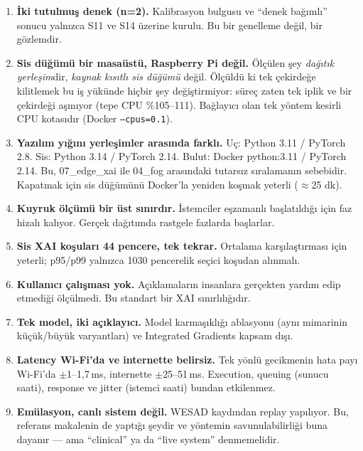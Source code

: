 \documentclass[11pt,a4paper]{report}
\newcommand{\ms}{\,ms}
\newcommand{\kod}[1]{\texttt{\small #1}}
\begin{document}
\begin{enumerate}[leftmargin=1.6em,itemsep=0.5em]

\item \textbf{İki tutulmuş denek (n=2).} Kalibrasyon bulgusu ve ``denek
bağımlı'' sonucu yalnızca S11 ve S14 üzerine kurulu. Bu bir genelleme değil,
bir gözlemdir.

\item \textbf{Sis düğümü bir masaüstü, Raspberry Pi değil.} Ölçülen şey
\emph{dağıtık yerleşim}dir, \emph{kaynak kısıtlı sis düğümü} değil. Ölçüldü ki
tek çekirdeğe kilitlemek bu iş yükünde hiçbir şey değiştirmiyor: süreç zaten
tek iplik ve bir çekirdeği aşmıyor (tepe CPU \%105--111). Bağlayıcı olan tek
yöntem kesirli CPU kotasıdır (Docker \kod{--cpus=0.1}).

\item \textbf{Yazılım yığını yerleşimler arasında farklı.} Uç: Python 3.11 /
PyTorch 2.8. Sis: Python 3.14 / PyTorch 2.14. Bulut: Docker python:3.11 /
PyTorch 2.14. Bu, 07\_edge\_xai ile 04\_fog arasındaki tutarsız sıralamanın
sebebidir. Kapatmak için sis düğümünü Docker'la yeniden koşmak yeterli
($\approx$25 dk).

\item \textbf{Kuyruk ölçümü bir üst sınırdır.} İstemciler eşzamanlı başlatıldığı
için faz hizalı kalıyor. Gerçek dağıtımda rastgele fazlarda başlarlar.

\item \textbf{Sis XAI koşuları 44 pencere, tek tekrar.} Ortalama karşılaştırması
için yeterli; p95/p99 yalnızca 1030 pencerelik seçici koşudan alınmalı.

\item \textbf{Kullanıcı çalışması yok.} Açıklamaların insanlara gerçekten
yardım edip etmediği ölçülmedi. Bu standart bir XAI sınırlılığıdır.

\item \textbf{Tek model, iki açıklayıcı.} Model karmaşıklığı ablasyonu (aynı
mimarinin küçük/büyük varyantları) ve Integrated Gradients kapsam dışı.

\item \textbf{Latency Wi-Fi'da ve internette belirsiz.} Tek yönlü gecikmenin
hata payı Wi-Fi'da $\pm$1--1{,}7\ms, internette $\pm$25--51\ms. Execution,
queuing (sunucu saati), response ve jitter (istemci saati) bundan etkilenmez.

\item \textbf{Emülasyon, canlı sistem değil.} WESAD kaydından replay yapılıyor.
Bu, referans makalenin de yaptığı şeydir ve yöntemin savunulabilirliği buna
dayanır --- ama ``clinical'' ya da ``live system'' denmemelidir.

\end{enumerate}
\end{document}
